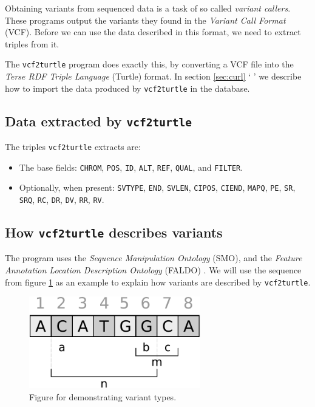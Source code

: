 \documentclass[11pt,a4paper,oneside]{book}
\begin{document}
  Obtaining variants from sequenced data is a task of so called
  \emph{variant callers}.  These programs output the variants they found in
  the \emph{Variant Call Format} (VCF).  Before we can use the data described
  in this format, we need to extract triples from it.

  The \texttt{vcf2turtle} program does exactly this, by converting a VCF file
  into the \emph{Terse RDF Triple Language} (Turtle) format.  In section
  \ref{sec:curl} {\color{LinkGray}`%
  '} we describe how to import the data produced by \texttt{vcf2turtle} in the
  database.

\subsection{Data extracted by \texttt{vcf2turtle}}

  The triples \texttt{vcf2turtle} extracts are:
  \begin{itemize}
    \item The base fields: \texttt{CHROM}, \texttt{POS}, \texttt{ID},
      \texttt{ALT}, \texttt{REF}, \texttt{QUAL}, and \texttt{FILTER}.
    \item Optionally, when present: \texttt{SVTYPE}, \texttt{END},
      \texttt{SVLEN}, \texttt{CIPOS}, \texttt{CIEND}, \texttt{MAPQ},
      \texttt{PE}, \texttt{SR}, \texttt{SRQ}, \texttt{RC}, \texttt{DR},
      \texttt{DV}, \texttt{RR}, \texttt{RV}.
  \end{itemize}

\subsection{How \texttt{vcf2turtle} describes variants}

  The program uses the \emph{Sequence Manipulation Ontology} (SMO)\cite{unknown},
  and the \emph{Feature Annotation Location Description Ontology} (FALDO)%
  \cite{unknown}.  We will use the sequence from figure \ref{fig:sequence} as
  an example to explain how variants are described by \texttt{vcf2turtle}.

\begin{figure}[H]
  \begin{center}
    \includegraphics[height=4cm]{figures/sequence.pdf}
    \caption{\small Figure for demonstrating variant types.}
    \label{fig:sequence}
  \end{center}
\end{figure}
\end{document}
